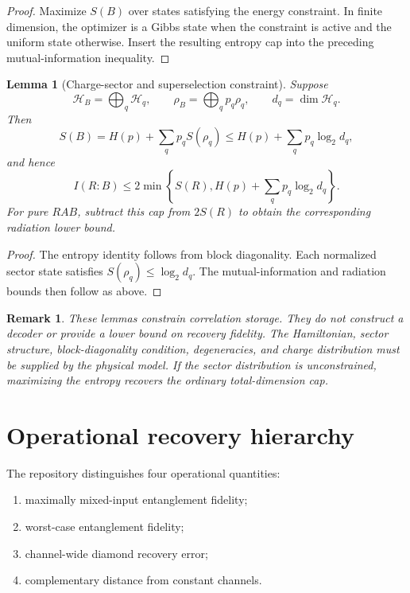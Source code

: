 \documentclass[11pt]{article}
\newtheorem{lemma}{Lemma}
\newtheorem{remark}{Remark}
\newcommand{\cH}{\mathcal H}
\begin{document}
\begin{proof}
Maximize $S(B)$ over states satisfying the energy constraint. In finite dimension, the optimizer is a Gibbs state when the constraint is active and the uniform state otherwise. Insert the resulting entropy cap into the preceding mutual-information inequality.
\end{proof}

\begin{lemma}[Charge-sector and superselection constraint]
Suppose
\[
\cH_B=\bigoplus_q\cH_q,
\qquad
\rho_B=\bigoplus_qp_q\rho_q,
\qquad
d_q=\dim\cH_q.
\]
Then
\[
S(B)=H(p)+\sum_qp_qS(\rho_q)
\leq H(p)+\sum_qp_q\log_2d_q,
\]
and hence
\[
I(R:B)\leq2\min\left\{S(R),H(p)+\sum_qp_q\log_2d_q\right\}.
\]
For pure $RAB$, subtract this cap from $2S(R)$ to obtain the corresponding radiation lower bound.
\end{lemma}

\begin{proof}
The entropy identity follows from block diagonality. Each normalized sector state satisfies $S(\rho_q)\leq\log_2d_q$. The mutual-information and radiation bounds then follow as above.
\end{proof}

\begin{remark}
These lemmas constrain correlation storage. They do not construct a decoder or provide a lower bound on recovery fidelity. The Hamiltonian, sector structure, block-diagonality condition, degeneracies, and charge distribution must be supplied by the physical model. If the sector distribution is unconstrained, maximizing the entropy recovers the ordinary total-dimension cap.
\end{remark}

\section{Operational recovery hierarchy}
\label{sec:recovery}

The repository distinguishes four operational quantities:

\begin{enumerate}
\item maximally mixed-input entanglement fidelity;
\item worst-case entanglement fidelity;
\item channel-wide diamond recovery error;
\item complementary distance from constant channels.
\end{enumerate}
\end{document}

